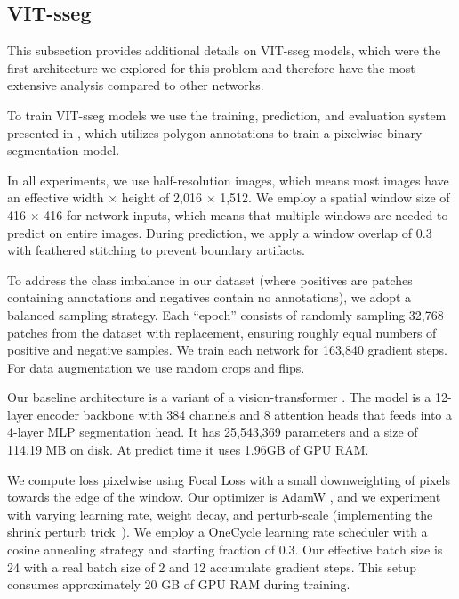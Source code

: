 \subsection{VIT-sseg}
\label{sec:vit_models}

This subsection provides additional details on VIT-sseg models, which were the first architecture we
  explored for this problem and therefore have the most extensive analysis compared to other networks.

To train VIT-sseg models we use the training, prediction, and evaluation system presented in
  \cite{Greenwell_2024_WACV, crall_geowatch_2024}, which utilizes polygon annotations to train a pixelwise
  binary segmentation model.

In all experiments, we use half-resolution images, which means most images have an effective width $\times$
  height of 2,016 $\times$ 1,512.
We employ a spatial window size of 416 $\times$ 416 for network inputs, which means that multiple windows
  are needed to predict on entire images.
During prediction, we apply a window overlap of 0.3 with feathered stitching to prevent boundary artifacts.

To address the class imbalance in our dataset (where positives are patches containing annotations and
  negatives contain no annotations), we adopt a balanced sampling strategy.
Each ``epoch'' consists of randomly sampling 32,768 patches from the dataset with replacement, ensuring
  roughly equal numbers of positive and negative samples.
We train each network for 163,840 gradient steps.
For data augmentation we use random crops and flips.

Our baseline architecture is a variant \cite{bertasius2021space,Greenwell_2024_WACV} of a vision-transformer
  \cite{dosovitskiy_image_2021}.
The model is a 12-layer encoder backbone with 384 channels and 8 attention heads that feeds into a 4-layer
  MLP segmentation head.
It has 25,543,369 parameters and a size of 114.19 MB on disk.
At predict time it uses 1.96GB of GPU RAM.

We compute loss pixelwise using Focal Loss \cite{ross2017focal} with a small downweighting of pixels towards
  the edge of the window.
Our optimizer is AdamW \cite{loshchilov_decoupled_2018}, and we experiment with varying learning rate,
  weight decay, and perturb-scale (implementing the shrink perturb trick~\cite{ash_warm_starting_2020,dohare_loss_2023}).
We employ a OneCycle learning rate scheduler \cite{smith2019super} with a cosine annealing strategy and
  starting fraction of 0.3.
Our effective batch size is 24 with a real batch size of 2 and 12 accumulate gradient steps.
This setup consumes approximately 20 GB of GPU RAM during training.

